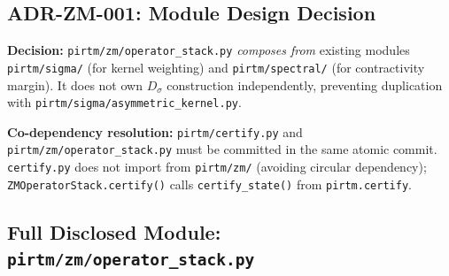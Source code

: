 \documentclass[12pt,letterpaper]{article}
\theoremstyle{definition}
\theoremstyle{remark}
\begin{document}
\subsection{ADR-ZM-001: Module Design Decision}

\textbf{Decision:} \texttt{pirtm/zm/operator\_stack.py} \emph{composes from}
existing modules \texttt{pirtm/sigma/} (for kernel weighting) and
\texttt{pirtm/spectral/} (for contractivity margin). It does not own
$D_\sigma$ construction independently, preventing duplication with
\texttt{pirtm/sigma/asymmetric\_kernel.py}.

\textbf{Co-dependency resolution:} \texttt{pirtm/certify.py} and
\texttt{pirtm/zm/operator\_stack.py} must be committed in the same atomic
commit. \texttt{certify.py} does not import from \texttt{pirtm/zm/}
(avoiding circular dependency); \texttt{ZMOperatorStack.certify()} calls
\texttt{certify\_state()} from \texttt{pirtm.certify}.

\subsection{Full Disclosed Module: \texttt{pirtm/zm/operator\_stack.py}}
\end{document}
